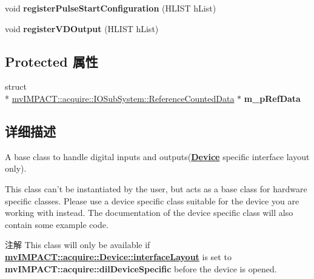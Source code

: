 \begin{DoxyCompactItemize}
\item 
\hypertarget{classmv_i_m_p_a_c_t_1_1acquire_1_1_i_o_sub_system_a38eb8b001bed98340a84c7dc4ed2a5ca}{void {\bfseries register\+Pulse\+Start\+Configuration} (H\+L\+I\+S\+T h\+List)}\label{classmv_i_m_p_a_c_t_1_1acquire_1_1_i_o_sub_system_a38eb8b001bed98340a84c7dc4ed2a5ca}

\item 
\hypertarget{classmv_i_m_p_a_c_t_1_1acquire_1_1_i_o_sub_system_a1c65dded338b5b954bdc60a9106211c4}{void {\bfseries register\+V\+D\+Output} (H\+L\+I\+S\+T h\+List)}\label{classmv_i_m_p_a_c_t_1_1acquire_1_1_i_o_sub_system_a1c65dded338b5b954bdc60a9106211c4}

\end{DoxyCompactItemize}
\subsection*{Protected 属性}
\begin{DoxyCompactItemize}
\item 
\hypertarget{classmv_i_m_p_a_c_t_1_1acquire_1_1_i_o_sub_system_ab0978dd09b8acebe1b38c249b482a41c}{struct \\*
\hyperlink{structmv_i_m_p_a_c_t_1_1acquire_1_1_i_o_sub_system_1_1_reference_counted_data}{mv\+I\+M\+P\+A\+C\+T\+::acquire\+::\+I\+O\+Sub\+System\+::\+Reference\+Counted\+Data} $\ast$ {\bfseries m\+\_\+p\+Ref\+Data}}\label{classmv_i_m_p_a_c_t_1_1acquire_1_1_i_o_sub_system_ab0978dd09b8acebe1b38c249b482a41c}

\end{DoxyCompactItemize}


\subsection{详细描述}
A base class to handle digital inputs and outputs({\bfseries \hyperlink{classmv_i_m_p_a_c_t_1_1acquire_1_1_device}{Device}} specific interface layout only). 

This class can't be instantiated by the user, but acts as a base class for hardware specific classes. Please use a device specific class suitable for the device you are working with instead. The documentation of the device specific class will also contain some example code.

\begin{DoxyNote}{注解}
This class will only be available if {\bfseries \hyperlink{classmv_i_m_p_a_c_t_1_1acquire_1_1_device_ab4dd0ecc9d456bb5ddc01d844c9d6f2d}{mv\+I\+M\+P\+A\+C\+T\+::acquire\+::\+Device\+::interface\+Layout}} is set to {\bfseries mv\+I\+M\+P\+A\+C\+T\+::acquire\+::dil\+Device\+Specific} before the device is opened. 
\end{DoxyNote}


